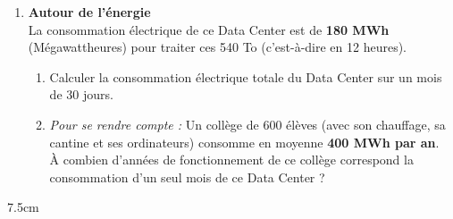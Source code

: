 \documentclass[a4paper]{book}
\begin{document}
{\begin{exercice}
\begin{enumerate}
            \item \textbf{Autour de l'énergie} \\
            La consommation électrique de ce Data Center est de \textbf{180 MWh} (Mégawattheures) pour traiter ces 540 To (c'est-à-dire en 12 heures).
            \begin{enumerate}
                \item Calculer la consommation électrique totale du Data Center sur un mois de 30 jours.
                \item \textit{Pour se rendre compte :} Un collège de 600 élèves (avec son chauffage, sa cantine et ses ordinateurs) consomme en moyenne \textbf{400 MWh par an}. \\
                À combien d'années de fonctionnement de ce collège correspond la consommation d'un seul mois de ce Data Center ?
            \end{enumerate}
        \end{enumerate}
        
        \begin{ZoneReponse}{7.5cm}
        \end{ZoneReponse}
    \end{exercice}

}
\end{document}
